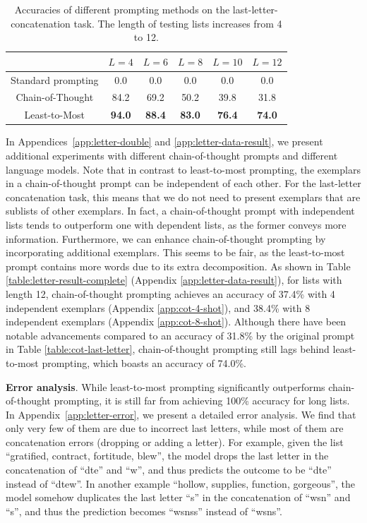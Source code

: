 \documentclass{article}
\begin{document}
\begin{table}[h!]
\centering
\begin{tabular}{ c | c c c c c } 
  \hline
   & {$L = 4$}  & {$L = 6$}  &  {$L = 8$} & {$L = 10$} & {$L = 12$}\\ 
  \hline
  Standard prompting &   0.0 & 0.0 & 0.0 & 0.0 & 0.0\\ 
  \hline
  Chain-of-Thought & 84.2 & 69.2 & 50.2 & 39.8 & 31.8\\ 
  \hline
  Least-to-Most &\textbf{94.0} &\textbf{88.4} &\textbf{83.0} &\textbf{76.4} & \textbf{74.0}\\ 
  \hline
\end{tabular}
\vspace{5pt}
\caption{Accuracies of different prompting methods on the last-letter-concatenation task. The length of testing lists increases from 4 to 12.}
\label{table:last-letter-result}
\end{table}

In Appendices~\ref{app:letter-double} and \ref{app:letter-data-result}, we present additional experiments with different chain-of-thought prompts and different language models. Note that in contrast to least-to-most prompting, the exemplars in a chain-of-thought prompt can be independent of each other. For the last-letter concatenation task, this means that we do not need to present exemplars that are sublists of other exemplars. In fact, a chain-of-thought prompt with independent lists tends to outperform one with dependent lists, as the former conveys more information. Furthermore, we can enhance chain-of-thought prompting by incorporating additional exemplars. This seems to be fair, as the least-to-most prompt contains more words due to its extra decomposition.  As shown in Table \ref{table:letter-result-complete} (Appendix \ref{app:letter-data-result}), for lists with length 12,  chain-of-thought prompting achieves an accuracy of 37.4\% with 4 independent exemplars (Appendix \ref{app:cot-4-shot}), and 38.4\% with 8 independent exemplars (Appendix \ref{app:cot-8-shot}). Although there have been notable advancements compared to an accuracy of 31.8\% by the original prompt in Table \ref{table:cot-last-letter}, chain-of-thought prompting still lags behind least-to-most prompting, which boasts an accuracy of 74.0\%. 

\textbf{Error analysis}. While least-to-most prompting significantly outperforms chain-of-thought prompting, it is still far from achieving 100\% accuracy for long lists. In Appendix~\ref{app:letter-error}, we present a detailed error analysis. We find that only very few of them are due to incorrect last letters, while most of them are concatenation errors (dropping or adding a letter). For example, given the list ``gratified, contract, fortitude, blew'', the model drops the last letter in the concatenation of ``dte'' and ``w'', and thus predicts the outcome to be ``dte'' instead of ``dtew''. In another example ``hollow, supplies, function, gorgeous'', the model somehow duplicates the last letter ``s'' in the concatenation of ``wsn'' and ``s'', and thus the prediction becomes ``wsnss'' instead of ``wsns''.
\end{document}
